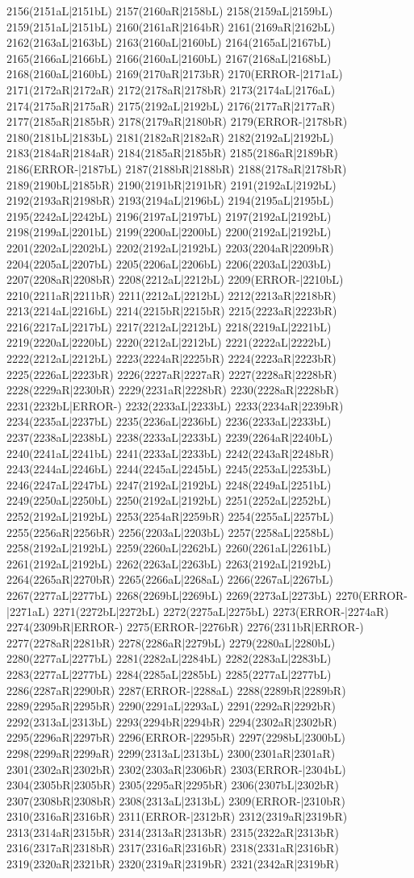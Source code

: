 2156(2151aL|2151bL) 2157(2160aR|2158bL) 2158(2159aL|2159bL) 2159(2151aL|2151bL) 2160(2161aR|2164bR) 2161(2169aR|2162bL) 2162(2163aL|2163bL) 2163(2160aL|2160bL) 2164(2165aL|2167bL) 2165(2166aL|2166bL) 2166(2160aL|2160bL) 2167(2168aL|2168bL) 2168(2160aL|2160bL) 2169(2170aR|2173bR) 2170(ERROR-|2171aL) 2171(2172aR|2172aR) 2172(2178aR|2178bR) 2173(2174aL|2176aL) 2174(2175aR|2175aR) 2175(2192aL|2192bL) 2176(2177aR|2177aR) 2177(2185aR|2185bR) 2178(2179aR|2180bR) 2179(ERROR-|2178bR) 2180(2181bL|2183bL) 2181(2182aR|2182aR) 2182(2192aL|2192bL) 2183(2184aR|2184aR) 2184(2185aR|2185bR) 2185(2186aR|2189bR) 2186(ERROR-|2187bL) 2187(2188bR|2188bR) 2188(2178aR|2178bR) 2189(2190bL|2185bR) 2190(2191bR|2191bR) 2191(2192aL|2192bL) 2192(2193aR|2198bR) 2193(2194aL|2196bL) 2194(2195aL|2195bL) 2195(2242aL|2242bL) 2196(2197aL|2197bL) 2197(2192aL|2192bL) 2198(2199aL|2201bL) 2199(2200aL|2200bL) 2200(2192aL|2192bL) 2201(2202aL|2202bL) 2202(2192aL|2192bL) 2203(2204aR|2209bR) 2204(2205aL|2207bL) 2205(2206aL|2206bL) 2206(2203aL|2203bL) 2207(2208aR|2208bR) 2208(2212aL|2212bL) 2209(ERROR-|2210bL) 2210(2211aR|2211bR) 2211(2212aL|2212bL) 2212(2213aR|2218bR) 2213(2214aL|2216bL) 2214(2215bR|2215bR) 2215(2223aR|2223bR) 2216(2217aL|2217bL) 2217(2212aL|2212bL) 2218(2219aL|2221bL) 2219(2220aL|2220bL) 2220(2212aL|2212bL) 2221(2222aL|2222bL) 2222(2212aL|2212bL) 2223(2224aR|2225bR) 2224(2223aR|2223bR) 2225(2226aL|2223bR) 2226(2227aR|2227aR) 2227(2228aR|2228bR) 2228(2229aR|2230bR) 2229(2231aR|2228bR) 2230(2228aR|2228bR) 2231(2232bL|ERROR-) 2232(2233aL|2233bL) 2233(2234aR|2239bR) 2234(2235aL|2237bL) 2235(2236aL|2236bL) 2236(2233aL|2233bL) 2237(2238aL|2238bL) 2238(2233aL|2233bL) 2239(2264aR|2240bL) 2240(2241aL|2241bL) 2241(2233aL|2233bL) 2242(2243aR|2248bR) 2243(2244aL|2246bL) 2244(2245aL|2245bL) 2245(2253aL|2253bL) 2246(2247aL|2247bL) 2247(2192aL|2192bL) 2248(2249aL|2251bL) 2249(2250aL|2250bL) 2250(2192aL|2192bL) 2251(2252aL|2252bL) 2252(2192aL|2192bL) 2253(2254aR|2259bR) 2254(2255aL|2257bL) 2255(2256aR|2256bR) 2256(2203aL|2203bL) 2257(2258aL|2258bL) 2258(2192aL|2192bL) 2259(2260aL|2262bL) 2260(2261aL|2261bL) 2261(2192aL|2192bL) 2262(2263aL|2263bL) 2263(2192aL|2192bL) 2264(2265aR|2270bR) 2265(2266aL|2268aL) 2266(2267aL|2267bL) 2267(2277aL|2277bL) 2268(2269bL|2269bL) 2269(2273aL|2273bL) 2270(ERROR-|2271aL) 2271(2272bL|2272bL) 2272(2275aL|2275bL) 2273(ERROR-|2274aR) 2274(2309bR|ERROR-) 2275(ERROR-|2276bR) 2276(2311bR|ERROR-) 2277(2278aR|2281bR) 2278(2286aR|2279bL) 2279(2280aL|2280bL) 2280(2277aL|2277bL) 2281(2282aL|2284bL) 2282(2283aL|2283bL) 2283(2277aL|2277bL) 2284(2285aL|2285bL) 2285(2277aL|2277bL) 2286(2287aR|2290bR) 2287(ERROR-|2288aL) 2288(2289bR|2289bR) 2289(2295aR|2295bR) 2290(2291aL|2293aL) 2291(2292aR|2292bR) 2292(2313aL|2313bL) 2293(2294bR|2294bR) 2294(2302aR|2302bR) 2295(2296aR|2297bR) 2296(ERROR-|2295bR) 2297(2298bL|2300bL) 2298(2299aR|2299aR) 2299(2313aL|2313bL) 2300(2301aR|2301aR) 2301(2302aR|2302bR) 2302(2303aR|2306bR) 2303(ERROR-|2304bL) 2304(2305bR|2305bR) 2305(2295aR|2295bR) 2306(2307bL|2302bR) 2307(2308bR|2308bR) 2308(2313aL|2313bL) 2309(ERROR-|2310bR) 2310(2316aR|2316bR) 2311(ERROR-|2312bR) 2312(2319aR|2319bR) 2313(2314aR|2315bR) 2314(2313aR|2313bR) 2315(2322aR|2313bR) 2316(2317aR|2318bR) 2317(2316aR|2316bR) 2318(2331aR|2316bR) 2319(2320aR|2321bR) 2320(2319aR|2319bR) 2321(2342aR|2319bR) 